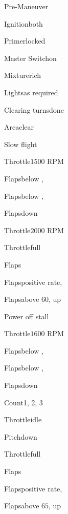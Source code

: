




\begin{multicols}{2}
\begin{checklist}{Pre-Maneuver}
    \item{Ignition}{both}
    \item{Primer}{locked}
    \item{Master Switch}{on}
    \item{Mixture}{rich}
    \item{Lights}{as required}
    \item{Clearing turns}{done}
    \item{Area}{clear}
\end{checklist}

\begin{checklist}{Slow flight}
  \item{Throttle}{$1500$ RPM}
  \item{Flaps}{below \vfe, \flapsfirstnotch}
  \item{Flaps}{below \vfe, \flapssecondnotch}
  \item{Flaps}{down}
  \item{Throttle}{$2000$ RPM}
  \item{Throttle}{full}
  \item{Flaps}{\flapssecondnotch}
  \item{Flaps}{positive rate, \flapsfirstnotch}
  \item{Flaps}{above 60, up}
\end{checklist}

\begin{checklist}{Power off stall}
  \item{Throttle}{$1600$ RPM}
  \item{Flaps}{below \vfe, \flapsfirstnotch}
  \item{Flaps}{below \vfe, \flapssecondnotch}
  \item{Flaps}{down}
  \item{Count}{1, 2, 3}
  \item{Throttle}{idle}
  \item{Pitch}{down}
  \item{Throttle}{full}
  \item{Flaps}{\flapssecondnotch}
  \item{Flaps}{positive rate, \flapsfirstnotch}
  \item{Flaps}{above $65$, up}
\end{checklist}


\end{multicols}
